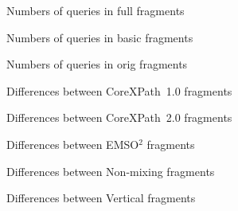 \documentclass{article}
\begin{document}
\begin{figure}
  \begin{center}
    
  \end{center}
  \caption{Numbers of queries in \textsf{full} fragments}
\end{figure}

\begin{figure}
  \begin{center}
    
  \end{center}
  \caption{Numbers of queries in \textsf{basic} fragments}
\end{figure}

\begin{figure}
  \begin{center}
    
  \end{center}
  \caption{Numbers of queries in \textsf{orig} fragments}
\end{figure}

\begin{figure}
  \begin{center}
    
  \end{center}
  \caption{Differences between \textsf{CoreXPath~1.0} fragments}
\end{figure}

\begin{figure}
  \begin{center}
    
  \end{center}
  \caption{Differences between \textsf{CoreXPath~2.0} fragments}
\end{figure}

\begin{figure}
  \begin{center}
    
  \end{center}
  \caption{Differences between \textsf{EMSO$^2$} fragments}
\end{figure}

\begin{figure}
  \begin{center}
    
  \end{center}
  \caption{Differences between \textsf{Non-mixing} fragments}
\end{figure}

\begin{figure}
  \begin{center}
    
  \end{center}
  \caption{Differences between \textsf{Vertical} fragments}
\end{figure}
\end{document}
